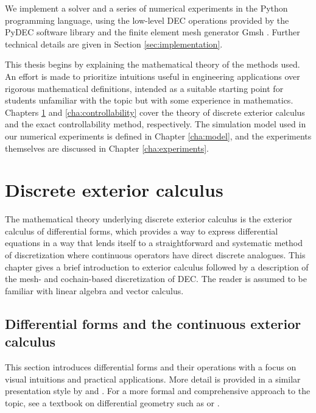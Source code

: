 \documentclass[utf8,english]{gradu3}
\begin{document}
We implement a solver and a series of numerical experiments
in the Python programming language,
using the low-level DEC operations provided by the
PyDEC software library \parencite{bell_pydec_2012}
and the finite element mesh generator Gmsh \parencite{geuzaine_gmsh_2009}.
Further technical details are given in Section \ref{sec:implementation}.

This thesis begins by explaining the mathematical theory of the methods used.
An effort is made to prioritize intuitions useful in engineering applications
over rigorous mathematical definitions,
intended as a suitable starting point for students unfamiliar with the topic
but with some experience in mathematics.
Chapters \ref{cha:dec} and \ref{cha:controllability} cover the theory of discrete exterior calculus
and the exact controllability method, respectively.
The simulation model used in our numerical experiments is defined in Chapter \ref{cha:model},
and the experiments themselves are discussed in Chapter \ref{cha:experiments}.


\chapter{Discrete exterior calculus}\label{cha:dec}

The mathematical theory underlying discrete exterior calculus
is the exterior calculus of differential forms,
which provides a way to express differential equations
in a way that lends itself to a straightforward and systematic
method of discretization where continuous operators
have direct discrete analogues.
This chapter gives a brief introduction to exterior calculus
followed by a description of the mesh- and cochain-based discretization of DEC.
The reader is assumed to be familiar with linear algebra and vector calculus.


\section{Differential forms and the continuous exterior calculus}

This section introduces differential forms and their operations
with a focus on visual intuitions and practical applications.
More detail is provided in a similar presentation style 
by \textcite{blair_perot_differential_2014} and \textcite{crane_digital_2013}.
For a more formal and comprehensive approach to the topic,
see a textbook on differential geometry such as \textcite{lee_introduction_2012}
or \textcite{abraham_manifolds_2012}.
\end{document}
